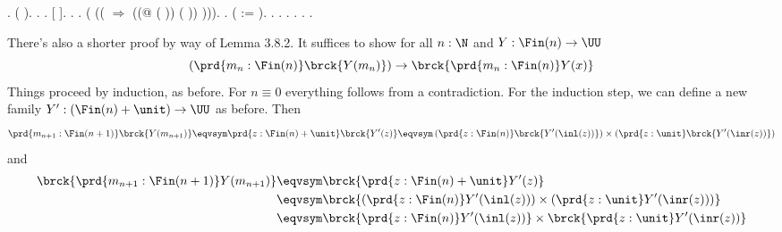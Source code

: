 \begin{coqdoccode}
\coqdocindent{1.00em}
 .  ( ).\coqdoceol
\coqdocemptyline
\coqdocindent{1.00em}
 .\coqdoceol
\coqdocindent{1.00em}
   .\coqdoceol
\coqdocindent{1.00em}
   [ ].\coqdoceol
\coqdocindent{1.00em}
 .\coqdoceol
\coqdocindent{1.00em}
.\coqdoceol
\coqdocindent{1.00em}
 ( \coqdocvar{\_} ((   \ensuremath{\Rightarrow}\coqdoceol
\coqdocindent{8.50em}
 ((@ \coqdocvar{\_} \coqdocvar{\_}  ( )) ( )) ))).\coqdoceol
\coqdocindent{1.00em}
 .\coqdoceol
\coqdocindent{1.00em}
 ( := ).\coqdoceol
\coqdocindent{1.00em}
   . .  .  .  .\coqdoceol
\coqdocnoindent
{}.\coqdoceol
\coqdocemptyline
\end{coqdoccode}
There's also a shorter proof by way of Lemma 3.8.2.  It suffices to show 
for all $n : \N$ and $Y : \Fin(n) \to \UU$
\[
  \left(\prd{m_{n} : \Fin(n)} \brck{Y(m_{n})}\right)
  \to
  \brck{\prd{m_{n} : \Fin(n)} Y(x)}
\]
Things proceed by induction, as before.  For $n \equiv 0$ everything follows
from a contradiction.  For the induction step, we can define a new family $Y' :
(\Fin(n) + \unit) \to \UU$ as before.  Then
\[
  \prd{m_{n+1} : \Fin(n+1)} \brck{Y(m_{n+1})}
  \eqvsym
  \prd{z : \Fin(n) + \unit} \brck{Y'(z)}
  \eqvsym
  \left(\prd{z : \Fin(n)} \brck{Y'(\inl(z))}\right)
  \times
  \left(\prd{z : \unit} \brck{Y'(\inr(z))}\right)
\]
and
\begin{align*}
  \brck{\prd{m_{n+1} : \Fin(n+1)} Y(m_{n+1})}
  &\eqvsym
  \brck{\prd{z : \Fin(n) + \unit} Y'(z)}
  \\&\eqvsym
  \brck{\left(\prd{z : \Fin(n)} Y'(\inl(z))\right)
  \times
  \left(\prd{z : \unit} Y'(\inr(z))\right)}
  \\&\eqvsym
  \brck{\prd{z : \Fin(n)} Y'(\inl(z))}
  \times
  \brck{\prd{z : \unit} Y'(\inr(z))}
\end{align*}
